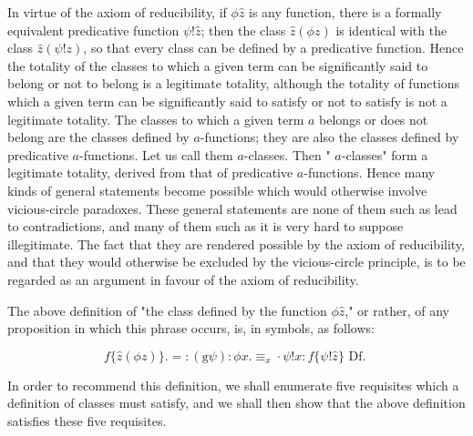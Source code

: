 \documentclass[10pt]{article}
\begin{document}
In virtue of the axiom of reducibility, if $\phi \hat{z}$ is any function, there is a formally equivalent predicative function $\psi!\hat{z}$; then the class $\hat{z}(\phi z)$ is identical with the class $\hat{z}(\psi!z)$, so that every class can be defined by a predicative function. Hence the totality of the classes to which a given term can be significantly said to belong or not to belong is a legitimate totality, although the totality of functions which a given term can be significantly said to satisfy or not to satisfy is not a legitimate totality. The classes to which a given term $a$ belongs or does not belong are the classes defined by $a$-functions; they are also the classes defined by predicative $a$-functions. Let us call them $a$-classes. Then " $a$-classes" form a legitimate totality, derived from that of predicative $a$-functions. Hence many kinds of general statements become possible which would otherwise involve vicious-circle paradoxes. These general statements are none of them such as lead to contradictions, and many of them such as it is very hard to suppose illegitimate. The fact that they are rendered possible by the axiom of reducibility, and that they would otherwise be excluded by the vicious-circle principle, is to be regarded as an argument in favour of the axiom of reducibility.

The above definition of "the class defined by the function $\phi \hat{z}$," or rather, of any proposition in which this phrase occurs, is, in symbols, as follows:

$$
f\{\hat{z}(\phi z)\} .=:(\mathrm{g} \psi): \phi x . \equiv_{x} \cdot \psi!x: f\{\psi!\hat{z}\} \text { Df. }
$$

In order to recommend this definition, we shall enumerate five requisites which a definition of classes must satisfy, and we shall then show that the above definition satisfies these five requisites.
\end{document}

